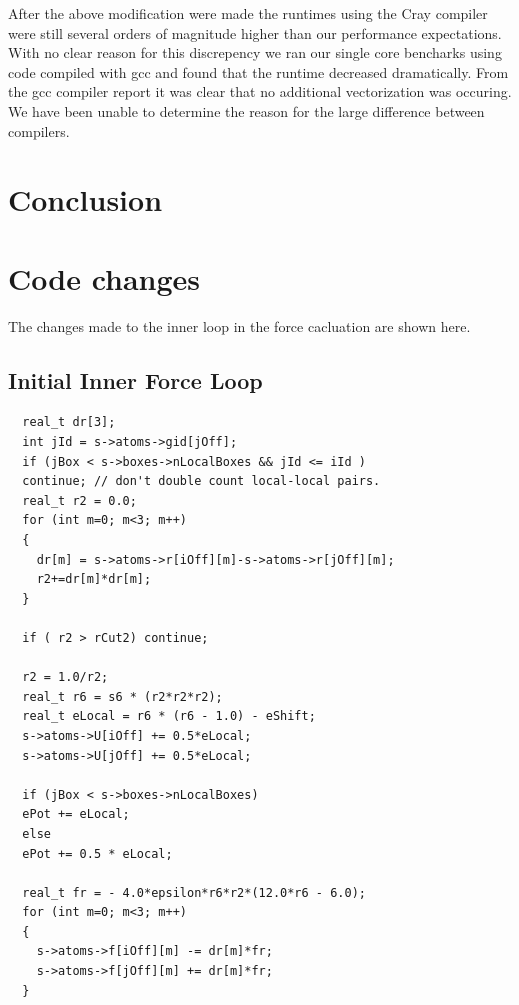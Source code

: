 \documentclass[12pt]{article}
\begin{document}
After the above modification were made the runtimes using the Cray
compiler were still several orders of magnitude higher than our
performance expectations. With no clear reason for this discrepency we
ran our single core bencharks using code compiled with gcc and found
that the runtime decreased dramatically. From the gcc compiler report
it was clear that no additional vectorization was occuring. We have
been unable to determine the reason for the large difference between
compilers.

\section{Conclusion}



\appendix
\section{Code changes}
\label{apd:code-changes}
The changes made to the inner loop in the force cacluation are shown
here.
\subsection{Initial Inner Force Loop}
\begin{lstlisting}
  real_t dr[3];
  int jId = s->atoms->gid[jOff];  
  if (jBox < s->boxes->nLocalBoxes && jId <= iId )
  continue; // don't double count local-local pairs.
  real_t r2 = 0.0;
  for (int m=0; m<3; m++)
  {
    dr[m] = s->atoms->r[iOff][m]-s->atoms->r[jOff][m];
    r2+=dr[m]*dr[m];
  }

  if ( r2 > rCut2) continue;

  r2 = 1.0/r2;
  real_t r6 = s6 * (r2*r2*r2);
  real_t eLocal = r6 * (r6 - 1.0) - eShift;
  s->atoms->U[iOff] += 0.5*eLocal;
  s->atoms->U[jOff] += 0.5*eLocal;

  if (jBox < s->boxes->nLocalBoxes)
  ePot += eLocal;
  else
  ePot += 0.5 * eLocal;

  real_t fr = - 4.0*epsilon*r6*r2*(12.0*r6 - 6.0);
  for (int m=0; m<3; m++)
  {
    s->atoms->f[iOff][m] -= dr[m]*fr;
    s->atoms->f[jOff][m] += dr[m]*fr;
  }
\end{lstlisting}
\end{document}
